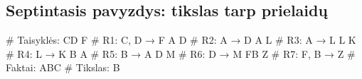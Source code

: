 \subsection{Septintasis pavyzdys: tikslas tarp prielaidų}

\begin{pythonaienv}[bc]
# Taisyklės:
CD F                                    # R1: C, D → F
A D                                     # R2: A → D
A L                                     # R3: A → L
L K                                     # R4: L → K
B A                                     # R5: B → A
D M                                     # R6: D → M
FB Z                                    # R7: F, B → Z
# Faktai:
ABC
# Tikslas:
B
\end{pythonaienv}
